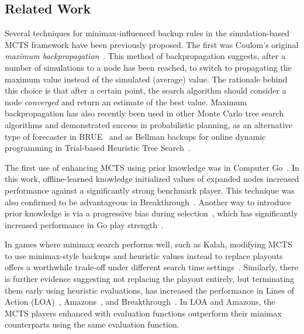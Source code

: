 \documentclass[conference]{IEEEtran}
\begin{document}
\subsection{Related Work}

Several techniques for minimax-influenced backup rules in the simulation-based MCTS framework have been previously proposed. 
The first was Coulom's original {\it maximum backpropagation}~\cite{Coulom06Efficient}. This method of backpropagation
suggests, after a number of simulations to a node has been reached, to switch to propagating the maximum value instead 
of the simulated (average) value. 
The rationale behind this choice is that after a certain point, the search algorithm should consider a node
{\it converged} and return an estimate of the best value. 
Maximum backpropagation has also recently been used in other Monte Carlo tree search algorithms and demonstrated success in
probabilistic planning, as an alternative type of forecaster in BRUE~\cite{Feldman13Theoretically} and as Bellman 
backups for online dynamic programming in Trial-based Heuristic Tree Search~\cite{Keller13Trial}.

The first use of enhancing MCTS using prior knowledge was in Computer Go~\cite{Gelly07Combining}. 
In this work, offline-learned knowledge initialized values of expanded nodes increased performance against a significantly 
strong benchmark player. 
This technique was also confirmed to be advantageous in Breakthrough~\cite{Lorentz13Breakthrough}. 
Another way to introduce prior knowledge is via a progressive bias during selection~\cite{Chaslot08Progressive}, which has 
significantly increased performance in Go play strength~\cite{Chaslot10Adding}. 

In games where minimax search performs well, such as Kalah, 
modifying MCTS to use minimax-style backups and heuristic values instead to replace playouts offers a worthwhile trade-off 
under different search time settings~\cite{Ramanujan11Tradeoffs}.
Similarly, there is further evidence suggesting not replacing the playout entirely, but terminating them early 
using heuristic evaluations, has increased the performance in Lines of Action (LOA)~\cite{Winands10MCTS-LOA}, 
Amazons~\cite{Kloetzer10Amazons,Lorentz08Amazons}, and Breakthrough~\cite{Lorentz13Breakthrough}. In LOA and Amazons, the 
MCTS players enhanced with evaluation functions outperform their minimax counterparts using the same evaluation function.

\end{document}
